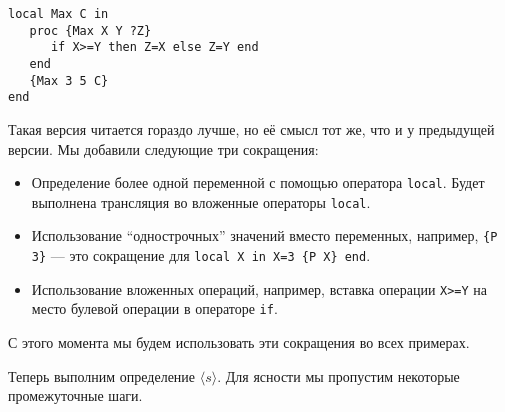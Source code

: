 \begin{lstlisting}
local Max C in
   proc {Max X Y ?Z}
      if X>=Y then Z=X else Z=Y end
   end
   {Max 3 5 C}
end
\end{lstlisting}

Такая версия читается гораздо лучше, но её смысл тот же, что и у предыдущей версии. Мы добавили следующие три сокращения:

\begin{itemize}
\item{Определение более одной переменной с помощью оператора \lstinline|local|. Будет выполнена трансляция во вложенные операторы \lstinline|local|.}

\item{Использование ``однострочных'' значений вместо переменных, например, \lstinline|{P 3}| --- это сокращение для \lstinline|local X in X=3 {P X} end|.}

\item{Использование вложенных операций, например, вставка операции \lstinline|X>=Y| на место булевой операции в операторе \lstinline|if|.}
\end{itemize}

С этого момента мы будем использовать эти сокращения во всех примерах.

Теперь выполним определение $\langle s \rangle$. Для ясности мы пропустим некоторые промежуточные шаги.

